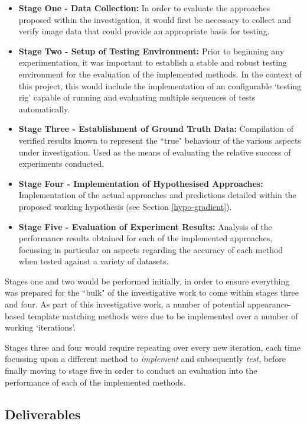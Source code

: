\begin{itemize}
	\item \textbf{Stage One - Data Collection:} In order to evaluate the approaches proposed within the investigation, it would first be necessary to collect and verify image data that could provide an appropriate basis for testing.
	\item \textbf{Stage Two - Setup of Testing Environment:} Prior to beginning any experimentation, it was important to establish a stable and robust testing environment for the evaluation of the implemented methods. In the context of this project, this would include the implementation of an configurable `testing rig' capable of running and evaluating multiple sequences of tests automatically.
	\item \textbf{Stage Three - Establishment of Ground Truth Data:} Compilation of verified results known to represent the ``true" behaviour of the various aspects under investigation. Used as the means of evaluating the relative success of experiments conducted.
	\item \textbf{Stage Four - Implementation of Hypothesised Approaches:} Implementation of the actual approaches and predictions detailed within the proposed working hypothesis (see Section \ref{hypo-gradient}).
	\item \textbf{Stage Five - Evaluation of Experiment Results:} Analysis of the performance results obtained for each of the implemented approaches, focussing in particular on aspects regarding the accuracy of each method when tested against a variety of datasets.
\end{itemize}  

Stages one and two would be performed initially, in order to ensure everything was prepared for the ``bulk" of the investigative work to come within stages three and four. As part of this investigative work, a number of potential appearance-based template matching methods were due to be implemented over a number of working `iterations'. 

Stages three and four would require repeating over every new iteration, each time focussing upon a different method to \textit{implement} and subsequently \textit{test}, before finally moving to stage five in order to conduct an evaluation into the performance of each of the implemented methods.

\subsection{Deliverables}

